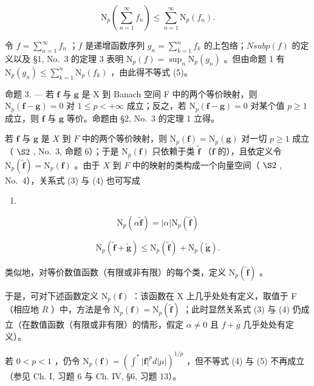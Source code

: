 \[
\mathrm{N} _ {p} \left(\sum_ {n = 1} ^ {\infty} f _ {n}\right) \leqslant \sum_ {n = 1} ^ {\infty} \mathrm{N} _ {p} (f _ {n}).\tag{5}
\]

令 \(f = \sum_{n=1}^{\infty} f_n\) ；\(f\) 是递增函数序列 \(g_n = \sum_{k=1}^{n} f_k\) 的上包络；\(N sub p(f)\) 的定义以及 §1, No.~3 的定理 3 表明 \(\mathrm{N}_{p}(f)=\sup_{n}\mathrm{N}_{p}(g_{n})\) 。但由命题 1 有 \(\mathrm{N}_{p}(g_{n})\leqslant\sum_{k=1}^{n}\mathrm{N}_{p}(f_{k})\) ，由此得不等式 (5)。

命题 3. --- 若 \(\mathbf{f}\) 与 \(\mathbf{g}\) 是 X 到 Banach 空间 F 中的两个等价映射，则 \(\mathrm{N}_p(\mathbf{f} - \mathbf{g}) = 0\) 对 \(1 \leqslant p < +\infty\) 成立；反之，若 \(\mathrm{N}_p(\mathbf{f} - \mathbf{g}) = 0\) 对某个值 \(p \geqslant 1\) 成立，则 \(\mathbf{f}\) 与 \(\mathbf{g}\) 等价。命题由 §2, No.~3 的定理 1 立得。

若 \(\mathbf{f}\) 与 \(\mathbf{g}\) 是 \(X\) 到 \(F\) 中的两个等价映射，则 \(\mathrm{N}_p(\mathbf{f}) = \mathrm{N}_p(\mathbf{g})\) 对一切 \(p \geqslant 1\) 成立（ \(\S 2\) , No.~3, 命题 6）；于是 \(\mathrm{N}_p(\mathbf{f})\) 只依赖于类 \(\widetilde{\mathbf{f}}\) （\(\mathbf{f}\) 的），且依定义令 \(\mathrm{N}_p(\widetilde{\mathbf{f}}) = \mathrm{N}_p(\mathbf{f})\) 。由于 \(X\) 到 \(F\) 中的映射的类构成一个向量空间（ \(\S 2\) , No.~4），关系式 (3) 与 (4) 也可写成

\begin{enumerate}
\def\labelenumi{(\arabic{enumi})}
\setcounter{enumi}{5}
\tightlist
\item
\end{enumerate}

\[
\mathrm{N} _ {p} (\alpha \widetilde {\mathbf {f}}) = | \alpha | \mathrm{N} _ {p} (\widetilde {\mathbf {f}})\tag{7}
\]

\[
\mathrm{N} _ {p} (\widetilde {\mathbf {f}} + \widetilde {\mathbf {g}}) \leqslant \mathrm{N} _ {p} (\widetilde {\mathbf {f}}) + \mathrm{N} _ {p} (\widetilde {\mathbf {g}}).
\]

类似地，对等价数值函数（有限或非有限）的每个类，定义 \(\mathrm{N}_{p}(\tilde{\mathbf{f}})\) 。

于是，可对下述函数定义 \(\mathrm{N}_{p}(\mathbf{f})\) ：该函数在 X 上几乎处处有定义，取值于 F （相应地 \(\overline{R}\) ）中，方法是令 \(\mathrm{N}_{p}(\mathbf{f})=\mathrm{N}_{p}(\widetilde{\mathbf{f}})\) ；此时显然关系式 (3) 与 (4) 仍成立（在数值函数（有限或非有限）的情形，假定 \(\alpha\neq0\) 且 \(f+g\) 几乎处处有定义）。

若 \(0 < p < 1\) ，仍令 \(\mathrm{N}_p(\mathbf{f}) = (\int^* |\mathbf{f}|^p d|\mu|)^{1/p}\) ，但不等式 (4) 与 (5) 不再成立（参见 Ch. I, 习题 6 与 Ch. IV, §6, 习题 13）。

